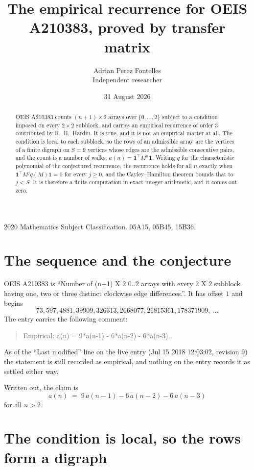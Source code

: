 \documentclass[11pt,a4paper]{article}
\title{The empirical recurrence for OEIS A210383, proved by transfer matrix}
\author{Adrian Perez Fontelles\\ \small Independent researcher}
\date{31 August 2026}
\theoremstyle{plain}
\theoremstyle{definition}
\begin{document}
\maketitle

\begin{abstract}
OEIS A210383 counts $(n+1)\times2$ arrays over $\{0,\dots,2\}$ subject to a condition imposed on
every $2\times2$ subblock, and carries an empirical recurrence of order $3$ contributed
by R.~H.~Hardin. It is true, and it is not an empirical matter at all. The condition is local
to each subblock, so the rows of an admissible array are the vertices of a finite digraph
on $S=9$ vertices whose edges are the admissible consecutive pairs, and the count is a
number of walks: $a(n)=\mathbf{1}^{\!\top}M^{n}\mathbf{1}$. Writing $q$
for the characteristic polynomial of the conjectured recurrence, the recurrence holds for all
$n$ exactly when $\mathbf{1}^{\!\top}M^{j}q(M)\mathbf{1}=0$ for every $j\ge0$, and the
Cayley--Hamilton theorem bounds that to $j<S$. It is therefore a finite computation in exact
integer arithmetic, and it comes out zero.
\end{abstract}

\noindent\small 2020 Mathematics Subject Classification. 05A15, 05B45, 15B36.\normalsize

\section{The sequence and the conjecture}

OEIS A210383 is ``Number of (n+1) X 2 0..2 arrays with every 2 X 2 subblock having one, two or three distinct clockwise edge differences.''. It has offset $1$ and begins
\[
73, 597, 4881, 39909, 326313, 2668077, 21815361, 178371909,\ \dots
\]
The entry carries the following comment:
\begin{quote}\small
Empirical: a(n) = 9*a(n-1) - 6*a(n-2) - 6*a(n-3).
\end{quote}
As of the ``Last modified'' line on the live entry (Jul 15 2018 12:03:02, revision 9) the statement is
still recorded as empirical, and nothing on the entry records it as settled either way.

Written out, the claim is
\begin{equation}\label{eq:conj}
a(n)\;=\;9\,a(n-1) - 6\,a(n-2) - 6\,a(n-3)
\end{equation}
for all $n>2$.

\section{The condition is local, so the rows form a digraph}
\end{document}
